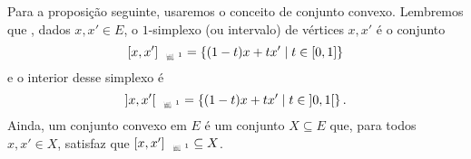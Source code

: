 \begin{comment}
Lembremos que o $d$-simplexo unitário (ou simplexo unitário $d$-dimensional) real é o conjunto
	\begin{align*}
	\Sx^d &= \set{x \in \R_{\geq}^{d+1}}{\sum_{k \in [d+1]} x_k = 1} \\
		&= \set{x \in \R_{\geq}^{d+1}}{\nor{x}_1 = 1}.
	\end{align*}
ou seja, os pontos $x = (x_0,\ldots,x_d) \in \R^{d+1}$ tais que, para todo $k \in [d+1]$, $x_k \geq 0$ e satisfazendo $\sum_{k \in [d+1]} x_k = 1$.

Dados um espaço normado $\bm E$ e $v_0, \ldots, v_d \in E$ tais que $\{v_1 - v_0,\ldots, v_d-v_0\}$ é linearmente independente, o simplexo gerado por esses vetores é o conjunto
	\begin{equation*}
	\Sxger[d]{v_0, \ldots, v_d} = \set{\sum_{k \in [d+1]} x_k v_k = 1}{x \in \Sx^d}
	\end{equation*}
e o interior desse simplexo é
	\begin{equation*}
	\Sxgera[d]{v_0, \ldots, v_d} = \set{\sum_{k \in [d+1]} x_k v_k = 1}{x \in \Sx^d}.
	\end{equation*}

Em particular, o $1$-simplexo é o conjunto $\simp^1 = \set{(1-t,t)}{t \in \intff{0}{1}}$ e dados $v,v' \in E$,
	\begin{equation*}
	\Sxger{v,v'} = \set{(1-t)v + tv'}{t \in \intff{0}{1}}
	\end{equation*}
e o interior desse simplexo é
	\begin{equation*}
	\Sxgera{v,v'} = \set{(1-t)v + tv'}{t \in \intaa{0}{1}}.
	\end{equation*}
\end{comment}

Para a proposição seguinte, usaremos o conceito de conjunto convexo. %
Lembremos que%
, dados $x,x' \in E$, o $1$-simplexo (ou intervalo) de vértices $x,x'$ é o conjunto
	\begin{equation*}
	\Sxger{x,x'} = \set{(1-t)x + tx'}{t \in \intff{0}{1}}
	\end{equation*}
e o interior desse simplexo é
	\begin{equation*}
	\Sxgera{x,x'} = \set{(1-t)x + tx'}{t \in \intaa{0}{1}}.
	\end{equation*}
Ainda, um conjunto convexo em $E$ é um conjunto $X \subseteq E$ que, para todos $x,x' \in X$, satisfaz que $\Sxger{x,x'} \subseteq X$.

